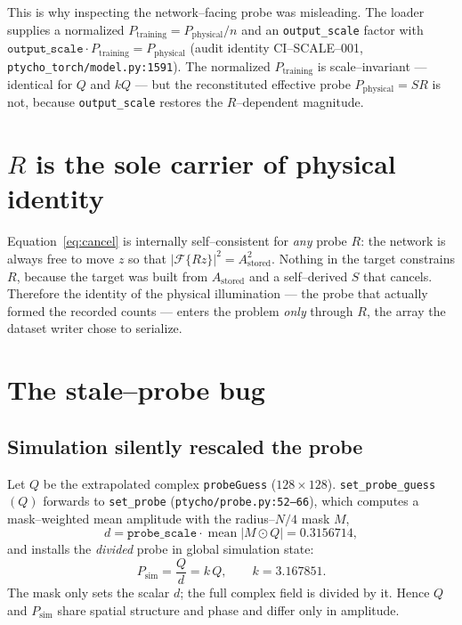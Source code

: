 \documentclass[11pt]{article}
\newcommand{\Astored}{A_{\mathrm{stored}}}
\newcommand{\Pphys}{P_{\mathrm{physical}}}
\newcommand{\Ptrain}{P_{\mathrm{training}}}
\newcommand{\Psim}{P_{\mathrm{sim}}}
\newcommand{\code}[1]{\texttt{#1}}
\begin{document}
This is why inspecting the network--facing probe was misleading. The loader
supplies a normalized $\Ptrain = \Pphys / n$ and an \code{output\_scale} factor
with $\code{output\_scale}\cdot\Ptrain = \Pphys$
(audit identity CI--SCALE--001, \code{ptycho\_torch/model.py:1591}). The
normalized $\Ptrain$ is scale--invariant --- identical for $Q$ and $kQ$ --- but
the reconstituted effective probe $\Pphys = S R$ is not, because
\code{output\_scale} restores the $R$--dependent magnitude.

\section{$R$ is the sole carrier of physical identity}

Equation~\eqref{eq:cancel} is internally self--consistent for \emph{any} probe
$R$: the network is always free to move $z$ so that
$|\mathcal{F}\{R z\}|^2 = \Astored^2$. Nothing in the target constrains $R$,
because the target was built from $\Astored$ and a self--derived $S$ that
cancels. Therefore the identity of the physical illumination --- the probe that
actually formed the recorded counts --- enters the problem \emph{only} through
$R$, the array the dataset writer chose to serialize.

\section{The stale--probe bug}

\subsection{Simulation silently rescaled the probe}

Let $Q$ be the extrapolated complex \code{probeGuess} ($128\times128$).
\code{set\_probe\_guess}$(Q)$ forwards to \code{set\_probe}
(\code{ptycho/probe.py:52--66}), which computes a mask--weighted mean amplitude
with the radius--$N/4$ mask $M$,
\begin{equation}
d = \code{probe\_scale}\cdot\operatorname{mean}\bigl|M\odot Q\bigr|
  = 0.3156714,
\end{equation}
and installs the \emph{divided} probe in global simulation state:
\begin{equation}
\Psim = \frac{Q}{d} = k\,Q, \qquad k = 3.167851 .
\end{equation}
The mask only sets the scalar $d$; the full complex field is divided by it.
Hence $Q$ and $\Psim$ share spatial structure and phase and differ only in
amplitude.
\end{document}
